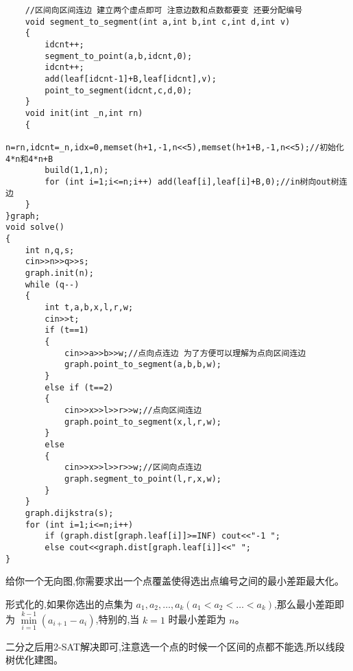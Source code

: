 \documentclass[a4paper]{ctexart}
\begin{document}
\begin{lstlisting}
    //区间向区间连边 建立两个虚点即可 注意边数和点数都要变 还要分配编号
    void segment_to_segment(int a,int b,int c,int d,int v)
    {
        idcnt++;
        segment_to_point(a,b,idcnt,0);
        idcnt++;
        add(leaf[idcnt-1]+B,leaf[idcnt],v);
        point_to_segment(idcnt,c,d,0);
    }
    void init(int _n,int rn)
    {
        n=rn,idcnt=_n,idx=0,memset(h+1,-1,n<<5),memset(h+1+B,-1,n<<5);//初始化4*n和4*n+B
        build(1,1,n);
        for (int i=1;i<=n;i++) add(leaf[i],leaf[i]+B,0);//in树向out树连边
    }
}graph;
void solve()
{
    int n,q,s;
    cin>>n>>q>>s;
    graph.init(n);
    while (q--)
    {
        int t,a,b,x,l,r,w;
        cin>>t;
        if (t==1)
        {
            cin>>a>>b>>w;//点向点连边 为了方便可以理解为点向区间连边
            graph.point_to_segment(a,b,b,w);
        }
        else if (t==2)
        {
            cin>>x>>l>>r>>w;//点向区间连边
            graph.point_to_segment(x,l,r,w);
        }
        else
        {
            cin>>x>>l>>r>>w;//区间向点连边
            graph.segment_to_point(l,r,x,w);
        }
    }
    graph.dijkstra(s);
    for (int i=1;i<=n;i++)
        if (graph.dist[graph.leaf[i]]>=INF) cout<<"-1 ";
        else cout<<graph.dist[graph.leaf[i]]<<" ";
}
\end{lstlisting}

给你一个无向图,你需要求出一个点覆盖使得选出点编号之间的最小差距最大化。

形式化的,如果你选出的点集为 $a_1,a_2,\dots,a_k (a_1<a_2<\dots<a_k)$,那么最小差距即为 $\min \limits_{i=1}^{k-1}{(a_{i+1}-a_i)}$,特别的,当 $k=1$ 时最小差距为 $n$。

二分之后用2-SAT解决即可,注意选一个点的时候一个区间的点都不能选,所以线段树优化建图。
\end{document}
